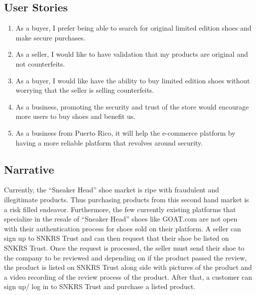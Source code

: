 \subsection{User Stories}
\begin{enumerate}
  \item As a buyer, I prefer being able to search for original limited edition shoes and make secure purchases.
  \item As a seller, I would like to have validation that my products are original and not counterfeits.
  \item As a buyer, I would like have the ability to buy limited edition shoes without worrying that the seller is selling counterfeits.
  \item As a business, promoting the security and trust of the store would encourage more users to buy shoes and benefit us.
  \item As a business from Puerto Rico, it will help the e-commerce platform by having a more reliable platform that revolves around security.
\end{enumerate}
\subsection{Narrative}
\hspace{1cm} Currently, the ``Sneaker Head'' shoe market is ripe with fraudulent and illegitimate products. Thus purchasing products from this second hand market is a risk filled endeavor. Furthermore, the few currently existing platforms that specialize in the resale of ``Sneaker Head'' shoes like GOAT.com are not open with their authentication process for shoes sold on their platform. A seller can sign up to SNKRS Trust and can then request that their shoe be listed on SNKRS Trust. Once the request is processed, the seller must send their shoe to the company to be reviewed and depending on if the product passed the review, the product is listed on SNKRS Trust along side with pictures of the product and a video recording of the review process of the product. After that, a customer can sign up/ log in to SNKRS Trust and purchase a listed product.
